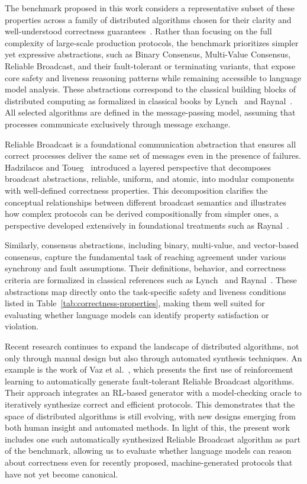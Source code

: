 The benchmark proposed in this work considers a representative subset of these properties across a family of distributed algorithms chosen for their clarity and well-understood correctness guarantees~\cite{correia2006from}. Rather than focusing on the full complexity of large-scale production protocols, the benchmark prioritizes simpler yet expressive abstractions, such as Binary Consensus, Multi-Value Consensus, Reliable Broadcast, and their fault-tolerant or terminating variants, that expose core safety and liveness reasoning patterns while remaining accessible to language model analysis. These abstractions correspond to the classical building blocks of distributed computing as formalized in classical books by Lynch~\cite{lynch1996distributed} and Raynal~\cite{raynal2013distributed}. All selected algorithms are defined in the message-passing model, assuming that processes communicate exclusively through message exchange.

Reliable Broadcast is a foundational communication abstraction that ensures all correct processes deliver the same set of messages even in the presence of failures. Hadzilacos and Toueg~\cite{hadzilacos1987modular} introduced a layered perspective that decomposes broadcast abstractions, reliable, uniform, and atomic, into modular components with well-defined correctness properties. This decomposition clarifies the conceptual relationships between different broadcast semantics and illustrates how complex protocols can be derived compositionally from simpler ones, a perspective developed extensively in foundational treatments such as Raynal~\cite{raynal2013distributed}. 

Similarly, consensus abstractions, including binary, multi-value, and vector-based consensus, capture the fundamental task of reaching agreement under various synchrony and fault assumptions. Their definitions, behavior, and correctness criteria are formalized in classical references such as Lynch~\cite{lynch1996distributed} and Raynal~\cite{raynal2013distributed}. These abstractions map directly onto the task-specific safety and liveness conditions listed in Table~\ref{tab:correctness-properties}, making them well suited for evaluating whether language models can identify property satisfaction or violation.

Recent research continues to expand the landscape of distributed algorithms, not only through manual design but also through automated synthesis techniques. An example is the work of Vaz et al.~\cite{vaz2023synthesis}, which presents the first use of reinforcement learning to automatically generate fault-tolerant Reliable Broadcast algorithms. Their approach integrates an RL-based generator with a model-checking oracle to iteratively synthesize correct and efficient protocols. This demonstrates that the space of distributed algorithms is still evolving, with new designs emerging from both human insight and automated methods. In light of this, the present work includes one such automatically synthesized Reliable Broadcast algorithm as part of the benchmark, allowing us to evaluate whether language models can reason about correctness even for recently proposed, machine-generated protocols that have not yet become canonical.

